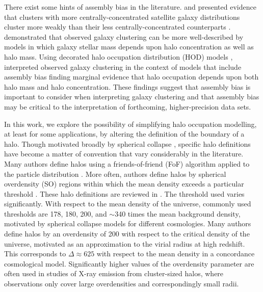 \documentclass[usenatbib,fleqn]{mnras}
\begin{document}
There exist some hints of assembly bias in the literature. \citet{miyatake_etal16} and \citet{more_etal16} presented 
evidence that clusters with more centrally-concentrated 
satellite galaxy distributions cluster more weakly than 
their less centrally-concentrated counterparts 
\citep[however][demonstrate that this claim is likely to be 
compromised by environment-dependent cluster membership assignment]{zu_mandelbaum16}. \citet{lehmann_etal17} demonstrated that observed galaxy 
clustering can be more well-described by models in which galaxy 
stellar mass depends upon halo concentration as well as halo mass. 
Using decorated halo occupation distribution (HOD) models \citep{hearin_etal16}, \citet{zentner_etal16} interpreted observed 
galaxy clustering in the context of models that include assembly bias 
finding marginal evidence that halo occupation depends upon both halo mass and halo concentration. These findings suggest that assembly bias is 
important to consider when interpreting galaxy clustering and that assembly bias may be critical to the interpretation of forthcoming, 
higher-precision data sets.

In this work, we explore the possibility of simplifying halo occupation modelling, at least for some applications, by altering the definition of the boundary of a halo. Though motivated broadly by spherical collapse \citep{gunn_gott72, fillmore_goldreich84, ryden_gunn87, lacey_cole93, eke_etal96, mota_vandebruck04, pace_etal10}, specific halo definitions have become a matter of convention that vary considerably in the literature. Many authors define halos using a friends-of-friend (FoF) algorithm applied to the particle distribution \citep[e.g., ][]{davis_etal85}. More often, authors define halos by spherical overdensity (SO) regions within which the mean density exceeds a particular threshold \citep[e.g., ][]{lacey_cole93}. These halo definitions are reviewed in \citet[][and references therein]{knebe_etal11}. The threshold used varies significantly. With respect to the mean density of the universe, commonly used thresholds are 178, 180, 200, and $\sim$340 times the mean background density, motivated by spherical collapse models for different cosmologies. Many authors define halos by an overdensity of 200 with respect to the critical density of the universe, motivated as an approximation to the virial radius at high redshift. This corresponds to $\Delta \approx 625$ with respect to the mean density in a concordance cosmological model. Significantly higher values of the overdensity parameter are often used in studies of X-ray emission from cluster-sized halos, where observations only cover large overdensities and correspondingly small radii.
\end{document}
